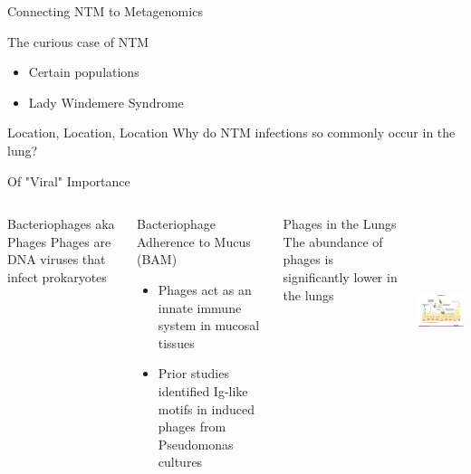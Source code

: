 \documentclass[11pt]{beamer}
\begin{document}
	\begin{frame}{Connecting NTM to Metagenomics}
	
	\begin{block}{The curious case of NTM}
	\begin{itemize}
	\item Certain populations 
	\item Lady Windemere Syndrome
	\end{itemize}
	\end{block}
	
	\begin{block}{Location, Location, Location}
	Why do NTM infections so commonly occur in the lung? 
	\end{block}
	
	
	
	
	\end{frame}
	
	
	\begin{frame}{Of "Viral" Importance}
	\begin{columns}
	
	\begin{block}{Bacteriophages aka Phages}
	Phages are DNA viruses that infect prokaryotes
	\end{block}
	
	\begin{block}{Bacteriophage Adherence to Mucus (BAM)}
	\begin{itemize}
	\item \alert{Phages act as an innate immune system in mucosal tissues}
	\item Prior studies identified Ig-like motifs in induced phages from Pseudomonas cultures
	\end{itemize}
	\end{block}
	
	\begin{block}{Phages in the Lungs}
	The abundance of phages is significantly lower in the lungs
	\end{block}
	
	\includegraphics[height=5.5cm, width=5cm]{barr.png}
	\end{columns}

	
	
	
	\end{frame}
	
\end{document}
